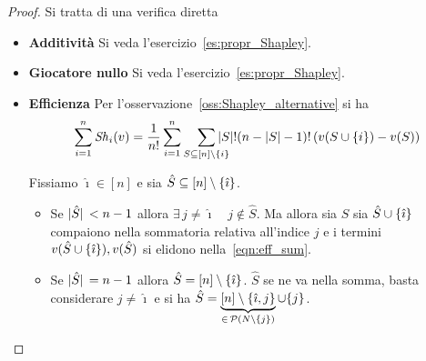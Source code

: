 \documentclass[a4paper,11pt]{article}
\theoremstyle{definition}				%
\theoremstyle{remark}
\theoremstyle{plain}
\begin{document}
	\begin{proof} Si tratta di una verifica diretta
		\begin{itemize}
			\item \textbf{Additività} Si veda l'esercizio~\ref{es:propr_Shapley}.
			\item \textbf{Giocatore nullo} Si veda l'esercizio~\ref{es:propr_Shapley}.
			\item \textbf{Efficienza} Per l'osservazione~\ref{oss:Shapley_alternative} si ha
				\begin{equation}\label{eqn:eff_sum}
						\sum_{i=1}^{n}\mathit{Sh}_i(v)=\frac{1}{n!}\sum_{i=1}^{n}\smashoperator[r]{\sum_{S\subseteq[n]\setminus\{i\}}}\qty|S|!(n-\qty|S|-1)!\left( v(S\cup\{i\})-v(S) \right)
				\end{equation} 
    
				Fissiamo $\hat{\imath}\in[n]$ e sia $\hat{S}\subseteq[n]\setminus\qty{\hat{\imath}}$.
				\begin{itemize}
					\item Se $\abs*{\hat{S}}<n-1$ allora $\exists\,j\ne\hat{\imath}\quad j\notin\hat{S}$. Ma allora sia $\hat{S}$ sia $\hat{S}\cup\qty{\hat{\imath}}$ compaiono 
					nella sommatoria relativa all'indice $j$ e i termini $v(\hat{S}\cup\qty{\hat{\imath}}),v(\hat{S})$ si elidono nella~\eqref{eqn:eff_sum}. 
					\item Se $\abs*{\hat{S}}=n-1$ allora $\hat{S}=[n]\setminus\qty{\hat{\imath}}$. $\hat{S}$ se ne va nella somma, basta considerare $j\ne\hat{\imath}$ e si ha
					$\hat{S}=\underbrace{[n]\setminus\qty{\hat{\imath},j}}_{\in\,\mathcal{P}\left(N\setminus\qty{j}\right)}\cup\qty{j}$. 


\end{itemize}
\end{itemize}
\end{proof}
\end{document}
